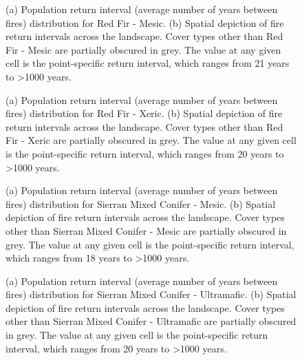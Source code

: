 \begin{figure}[!htbp]
  \centering
  \caption{(a) Population return interval (average number of years between fires) distribution for Red Fir - Mesic.  (b) Spatial depiction of fire return intervals across the landscape. Cover types other than Red Fir - Mesic are partially obscured in grey. The value at any given cell is the point-specific return interval, which ranges from 21 years to \textgreater 1000 years.}
\label{fig:preturn_rfrm}
\end{figure}

\begin{figure}[!htbp]
  \centering
  \caption{(a) Population return interval (average number of years between fires) distribution for Red Fir - Xeric.  (b) Spatial depiction of fire return intervals across the landscape. Cover types other than Red Fir - Xeric are partially obscured in grey. The value at any given cell is the point-specific return interval, which ranges from 20 years to \textgreater 1000 years.}
\label{fig:preturn_rfrx}
\end{figure}

\begin{figure}[!htbp]
  \centering
  \caption{(a) Population return interval (average number of years between fires) distribution for Sierran Mixed Conifer - Mesic.  (b) Spatial depiction of fire return intervals across the landscape. Cover types other than Sierran Mixed Conifer - Mesic are partially obscured in grey. The value at any given cell is the point-specific return interval, which ranges from 18 years to \textgreater 1000 years.}
\label{fig:preturn_smcm}
\end{figure}

\begin{figure}[!htbp]
  \centering
  \caption{(a) Population return interval (average number of years between fires) distribution for Sierran Mixed Conifer - Ultramafic.  (b) Spatial depiction of fire return intervals across the landscape. Cover types other than Sierran Mixed Conifer - Ultramafic are partially obscured in grey. The value at any given cell is the point-specific return interval, which ranges from 20 years to \textgreater 1000 years.}
\label{fig:preturn_smcu}
\end{figure}

